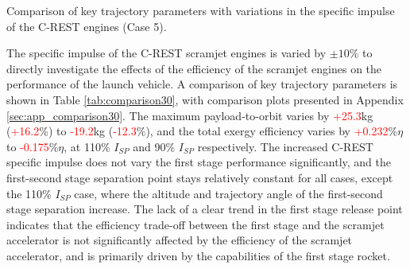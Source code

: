 \begin{table}[ht!]
	
	\caption{Comparison of key trajectory parameters with variations in the specific impulse of the C-REST engines (Case 5).}
	\label{tab:comparison30}
\end{table}

The specific impulse of the C-REST scramjet engines is varied by $\pm10\%$ to directly investigate the effects of the efficiency of the scramjet engines on the performance of the launch vehicle. A comparison of key trajectory parameters is shown in Table \ref{tab:comparison30}, with comparison plots presented in Appendix \ref{sec:app_comparison30}. The maximum payload-to-orbit varies by \textcolor{red}{+25.3}kg (\textcolor{red}{+16.2}\%) to \textcolor{red}{-19.2}kg (\textcolor{red}{-12.3}\%), and the total exergy efficiency varies by \textcolor{red}{+0.232}\%$\eta$ to \textcolor{red}{-0.175}\%$\eta$, at 110\% $I_{SP}$ and 90\% $I_{SP}$ respectively. 
The increased C-REST specific impulse does not vary the first stage performance significantly, and the first-second stage separation point stays relatively constant for all cases, except the 110\% $I_{SP}$ case, where the altitude and trajectory angle of the first-second stage separation increase.   
The lack of a clear trend in the first stage release point indicates that the efficiency trade-off between the first stage and the scramjet accelerator is not significantly affected by the efficiency of the scramjet accelerator, and is primarily driven by the capabilities of the first stage rocket. 

